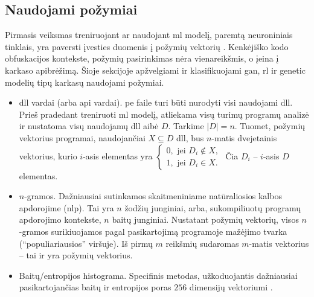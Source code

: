 \subsection{Naudojami požymiai}\label{sec:literature:features}
\color{red}
Pirmasis veiksmas treniruojant ar naudojant \ac{ml} modelį, paremtą neuroniniais tinklais, yra paversti įvesties duomenis į požymių vektorių \citeplace. Kenkėjiško kodo obfuskacijos kontekste, požymių pasirinkimas nėra vienareikšmis, o įeina į karkaso apibrėžimą. Šioje sekcijoje apžvelgiami ir klasifikuojami \acs{gan}, \acs{rl} ir \acs{genetic} modelių tipų karkasų naudojami požymiai.
\color{black}
\begin{itemize}
    \item \acs{dll} vardai (arba \acs{api} vardai). \acs{pe} faile turi būti nurodyti visi naudojami \acs{dll}. Prieš pradedant treniruoti \acs{ml} modelį, atliekama visų turimų programų analizė ir nustatoma visų naudojamų \acs{dll} aibė $D$. Tarkime $|D| = n$. Tuomet, požymių vektorius programai, naudojančiai $X \subseteq D$ \acs{dll}, bus $n$-matis dvejetainis vektorius, kurio $i$-asis elementas yra $\begin{cases}
        0, \text{ jei } D_i \not \in X,\\
        1, \text{ jei } D_i \in X.
    \end{cases}$ Čia $D_i$ -- $i$-asis $D$ elementas.
    \item $n$-gramos. Dažniausiai sutinkamos skaitmeniniame natūraliosios kalbos apdorojime (\acs{nlp}). Tai yra $n$ žodžių junginiai, arba, sukompiliuotų programų apdorojimo kontekste, $n$ baitų junginiai. Nustatant požymių vektorių, visos $n$-gramos surikiuojamos pagal pasikartojimą programoje mažėjimo tvarka (\enquote{populiariausios} viršuje). Iš pirmų $m$ reikšmių sudaromas $m$-matis vektorius -- tai ir yra požymių vektorius.
    \item Baitų/entropijos histograma. Specifinis metodas, užkoduojantis dažniausiai pasikartojančias baitų ir entropijos poras $256$ dimensijų vektoriumi \cite{saxeDeepNeuralNetwork2015}.
\end{itemize}